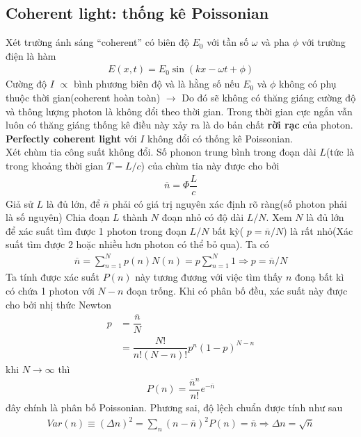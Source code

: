 \documentclass{report}
\newcommand{\f}[2]{\dfrac{#1}{#2}}
\begin{document}
\subsection{Coherent light: thống kê Poissonian}
Xét trường ánh sáng ``coherent'' có biên độ $E_{0}$ với tần số $\omega$ và pha $\phi$ với trường điện là hàm 
\begin{gather}
	E(x,t) = E_{0} \sin(kx - \omega t + \phi)
\end{gather}
Cường độ $I$ $\propto$ bình phương biên độ và là hằng số nếu $E_0$ và $\phi$ không có phụ thuộc thời gian(coherent hoàn toàn) $\rightarrow$ Do đó sẽ không có thăng giáng cường độ và thông lượng photon là không đổi theo thời gian. Trong thời gian cực ngắn vẫn luôn có thăng giáng thống kê điều này xảy ra là do bản chất \textbf{rời rạc} của photon. \\
\textbf{Perfectly coherent light} với $I$ không đổi có thống kê Poissonian.\\
Xét chùm tia công suất không đổi. Số phonon trung bình trong đoạn dài $L$(tức là trong khoảng thời gian $T = L / c$) của chùm tia này được cho bởi
\begin{gather}
	\overline{n} = \Phi \f{L}{c}
\end{gather}
Giả sử $L$ là đủ lớn, để $\overline{n}$ phải có giá trị nguyên xác định rõ ràng(số photon phải là số nguyên) Chia đoạn $L$ thành $N$ đoạn nhỏ có độ dài $L/N$. Xem $N$ là đủ lớn để xác suất tìm được 1 photon trong đoạn $L/N$ bất kỳ( $p = \overline{n} / N$) là rất nhỏ(Xác suất tìm được 2 hoặc nhiều hơn photon có thể bỏ qua). Ta có
\begin{gather}
	\overline{n} = \sum_{n = 1}^{N} p(n) N(n) = p \sum_{n = 1}^{N} 1  \Rightarrow p = \overline{n} / N
\end{gather}
Ta tính được xác suất $P(n)$ này tương đương với việc tìm thấy $n$ đonạ bất kì có chứa 1 photon với $N - n$ đoạn trống. Khi có phân bố đều, xác suất này được cho bởi nhị thức Newton
\begin{equation}
	\begin{aligned}
		p 
		&= \f{\overline{n}}{N}\\
		&= \f{N!}{n!(N-n)!} p^{n} (1 - p)^{N-n}
	\end{aligned}
\end{equation}
khi $N\rightarrow \infty$ thì
\begin{gather}
	P(n) = \f{\overline{n}^{n}}{n!} e^{- \overline{n}}
\end{gather}
đây chính là phân bố Poissonian. Phương sai, độ lệch chuẩn được tính như sau
\begin{gather}
	Var(n) \equiv (\Delta n)^{2} = \sum_{n} (n - \overline{n})^{2} P(n) = \overline{n} \Rightarrow \Delta n = \sqrt{\overline{n}}
\end{gather}
\end{document}
